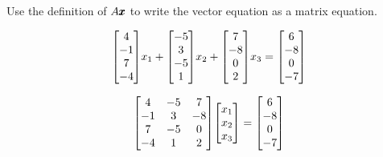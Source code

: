 \documentclass{../mathhomework}
\newenvironment{Mat}{\begin{bmatrix}}{\end{bmatrix}}
\begin{document}
\begin{problem}[1.4\#7]
    Use the definition of $A\pmb{x}$ to write the vector equation as a matrix equation.

    \begin{equation*}
        \begin{Mat}
            4 \\ -1 \\ 7 \\ -4
        \end{Mat}x_1 + \begin{Mat}
            -5 \\ 3 \\ -5 \\ 1
        \end{Mat}x_2 + \begin{Mat}
            7 \\ -8 \\ 0 \\ 2
        \end{Mat}x_3 = \begin{Mat}
            6 \\ -8 \\ 0 \\ -7
        \end{Mat}
    \end{equation*}

    \begin{solution}
        \begin{equation*}
            \begin{Mat}
                4 & -5 & 7 \\
                -1 & 3 & -8 \\
                7 & -5 & 0 \\
                -4 & 1 & 2
            \end{Mat}
            \begin{Mat}
                x_1 \\ x_2 \\ x_3
            \end{Mat}
            =
            \begin{Mat}
                6 \\ -8 \\ 0 \\ -7
            \end{Mat}
        \end{equation*}
    \end{solution}
\end{problem}
\end{document}
